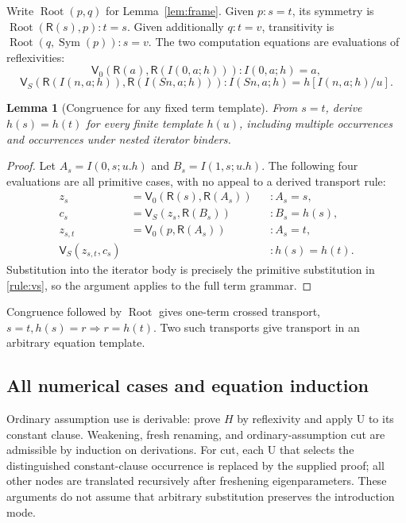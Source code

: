 \documentclass[11pt]{article}
\newtheorem{lemma}[theorem]{Lemma}
\theoremstyle{definition}
\newcommand{\Refl}{\mathsf R}
\newcommand{\Eval}{\mathsf V}
\begin{document}
Write $\operatorname{Root}(p,q)$ for Lemma~\ref{lem:frame}. Given
$p:s=t$, its symmetry is
$\operatorname{Root}(\Refl(s),p):t=s$. Given additionally $q:t=v$,
transitivity is $\operatorname{Root}(q,\operatorname{Sym}(p)):s=v$.
The two computation equations are evaluations of reflexivities:
\[
 \Eval_0(\Refl(a),\Refl(I(0,a;h))) : I(0,a;h)=a,
\]
\[
 \Eval_S(\Refl(I(n,a;h)),\Refl(I(Sn,a;h)))
 : I(Sn,a;h)=h[I(n,a;h)/u].
\]

\begin{lemma}[Congruence for any fixed term template]
\label{lem:congruence}
From $s=t$, derive $h(s)=h(t)$ for every finite template $h(u)$,
including multiple occurrences and occurrences under nested iterator binders.
\end{lemma}
\begin{proof}
Let $A_s=I(0,s;u.h)$ and $B_s=I(1,s;u.h)$. The following four evaluations
are all primitive cases, with no appeal to a derived transport rule:
\[
\begin{aligned}
 z_s&=\Eval_0(\Refl(s),\Refl(A_s))&&:A_s=s,\\
 c_s&=\Eval_S(z_s,\Refl(B_s))&&:B_s=h(s),\\
 z_{s,t}&=\Eval_0(p,\Refl(A_s))&&:A_s=t,\\
 \Eval_S(z_{s,t},c_s)&&&:h(s)=h(t).
\end{aligned}
\]
Substitution into the iterator body is precisely the primitive substitution
in \eqref{rule:vs}, so the argument applies to the full term grammar.
\end{proof}

Congruence followed by $\operatorname{Root}$ gives one-term crossed
transport, $s=t, h(s)=r\Rightarrow r=h(t)$. Two such transports give
transport in an arbitrary equation template.

\subsection{All numerical cases and equation induction}

Ordinary assumption use is derivable: prove $H$ by reflexivity and apply
U to its constant clause. Weakening, fresh renaming, and ordinary-assumption
cut are admissible by induction on derivations. For cut, each U that selects
the distinguished constant-clause occurrence is replaced by the supplied
proof; all other nodes are translated recursively after freshening
eigenparameters. These arguments do not assume that arbitrary substitution
preserves the introduction mode.
\end{document}
